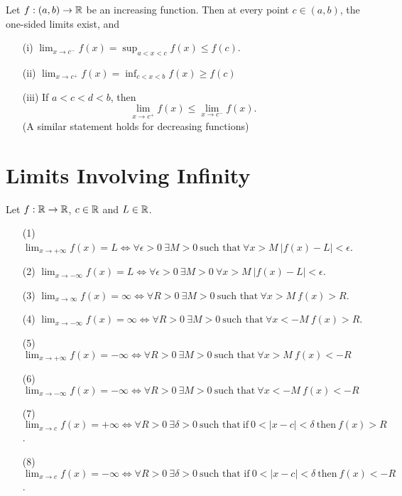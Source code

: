 \documentclass[a4paper]{article}
\begin{document}
\begin{theorem}
   Let \( f: (a,b) \to \mathbb{R}  \) be an increasing function. Then at every point \( c \in (a,b) \), the one-sided limits exist, and 
   \begin{enumerate}
       \item[(i)] \( \lim_{ x \to c^{-} } f(x) = \sup_{a < x < c} f(x) \leq f(c) \).
       \item[(ii)] \( \lim_{ x \to c^{+} } f(x) = \inf_{c < x < b} f(x) \geq f(c) \) 
       \item[(iii)] If \( a <  c < d < b \), then
           \[  \lim_{ x \to c^{+} }  f(x) \leq \lim_{ x \to c^{-} } f(x). \]
           (A similar statement holds for decreasing functions)
   \end{enumerate} 
\end{theorem}

\section{Limits Involving Infinity}\label{Limits Involving Infinity}

Let \( f: \mathbb{R} \to \mathbb{R}  \), \( c \in \mathbb{R}  \) and \( L \in \mathbb{R}  \). 

\begin{enumerate}
    \item[(1)] \( \lim_{ x \to + \infty  } f(x) = L \iff \forall \epsilon > 0 \ \exists M > 0 \ \text{such that} \ \forall x > M \ | f(x) - L | < \epsilon \).
    \item[(2)] \( \lim_{ x \to - \infty   }  f(x) = L \iff \forall \epsilon > 0 \ \exists M > 0 \ \forall x > M \ | f(x) - L  | < \epsilon   \).
    \item[(3)] \( \lim_{ x \to \infty  } f(x) = \infty \iff \forall R > 0 \ \exists M > 0 \ \text{such that} \ \forall x > M \ f(x) > R  \).
    \item[(4)] \( \lim_{ x \to - \infty   }  f(x) = \infty \iff \forall R > 0 \ \exists M > 0 \ \text{such that} \ \forall x < - M  \ f(x) > R  \).
    \item[(5)] \( \lim_{ x \to + \infty  } f(x) = - \infty \iff \forall R > 0 \ \exists M > 0 \ \text{such that} \ \forall x > M \ f(x) < - R   \) 
    \item[(6)] \( \lim_{ x \to - \infty  } f(x) = - \infty \iff \forall R > 0 \ \exists M > 0 \ \text{such that} \ \forall x < - M  \ f(x) < - R  \)
    \item[(7)] \( \lim_{ x \to c }  f(x) = + \infty \iff \forall R > 0 \ \exists \delta > 0 \ \text{such that} \ \text{if} \ 0 < |  x - c  | < \delta \ \text{then} \ f(x) > R  \).
    \item[(8)] \( \lim_{ x \to c } f(x) = - \infty \iff \forall R > 0 \ \exists \delta  > 0 \ \text{such that if} \ 0 < | x - c  |  < \delta \ \text{then} \ f(x) < - R  \).
\end{enumerate}
\end{document}
